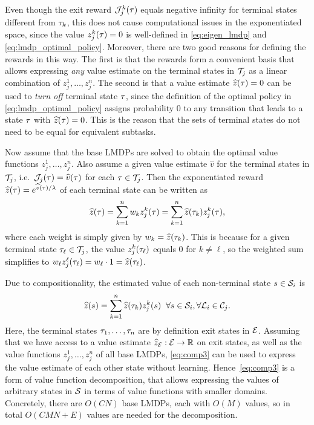 Even though the exit reward $\mathcal{J}_j^k(\tau)$ equals negative infinity for terminal states different from $\tau_k$, this does not cause computational issues in the exponentiated space, since the value $z_j^k(\tau)=0$ is well-defined in \eqref{eq:eigen_lmdp} and \eqref{eq:lmdp_optimal_policy}.
Moreover, there are two good reasons for defining the rewards in this way. The first is that the rewards form a convenient basis that allows expressing {\em any} value estimate on the terminal states in $\mathcal{T}_j$ as a linear combination of $z_j^1,\ldots,z_j^n$.
The second is that a value estimate $\widehat{z}(\tau)=0$ can be used to {\em turn off} terminal state $\tau$, since the definition of the optimal policy in \eqref{eq:lmdp_optimal_policy} assigns probability $0$ to any transition that leads to a state $\tau$ with $\widehat{z}(\tau)=0$. %
This is the reason that the sets of terminal states do not need to be equal for equivalent subtasks.

Now assume that the base LMDPs are solved to obtain the optimal value functions $z_j^1,\ldots,z_j^n$. Also assume a given value estimate $\widehat{v}$ for the terminal states in $\mathcal{T}_j$, i.e.~$\mathcal{J}_j(\tau)=\widehat{v}(\tau)$ for each $\tau\in\mathcal{T}_j$. Then the exponentiated reward $\widehat{z}(\tau)=e^{\widehat{v}(\tau)/\lambda}$ of each terminal state can be written as
\begin{equation}\label{eq:comp}
\widehat{z}(\tau) = \sum_{k=1}^n w_kz_j^k(\tau) = \sum_{k=1}^n \widehat{z}(\tau_k) z_j^k(\tau),
\end{equation}
where each weight is simply given by $w_k=\widehat{z}(\tau_k)$. This is because for a given terminal state $\tau_\ell\in\mathcal{T}_j$, the value $z_j^k(\tau_\ell)$ equals $0$ for $k\neq \ell$, so the weighted sum simplifies to $w_\ell z_j^\ell(\tau_\ell)=w_\ell\cdot 1=\widehat{z}(\tau_\ell)$.

Due to compositionality, the estimated value of each non-terminal state $s\in\mathcal{S}_i$ is
\begin{align}\label{eq:comp3}
\widehat{z}(s)=\sum_{k=1}^n \widehat{z}(\tau_k) z_j^k(s) \;\; \forall s\in\mathcal{S}_i,\forall\mathcal{L}_i\in\mathcal{C}_j.
\end{align}
Here, the terminal states $\tau_1,\ldots,\tau_n$ are by definition exit states in $\mathcal{E}$. Assuming that we have access to a value estimate $\widehat{z}_{\mathcal{E}}:\mathcal{E}\rightarrow\mathbb{R}$ on exit states, as well as the value functions $z_j^1,\ldots,z_j^n$ of all base LMDPs, \eqref{eq:comp3} can be used to express the value estimate of each other state without learning. Hence~\eqref{eq:comp3} is a form of value function decomposition, that allows expressing the values of arbitrary states in $\mathcal{S}$ in terms of value functions with smaller domains. Concretely, there are $O(CN)$ base LMDPs, each with $O(M)$ values, so in total $O(CMN+E)$ values are needed for the decomposition.

